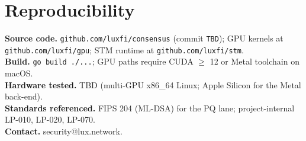 \documentclass[11pt,a4paper]{article}
\begin{document}



\appendix
\section*{Reproducibility}
\textbf{Source code.} \texttt{github.com/luxfi/consensus} (commit \texttt{TBD}); GPU kernels at \texttt{github.com/luxfi/gpu}; STM runtime at \texttt{github.com/luxfi/stm}.\\
\textbf{Build.} \texttt{go build ./...}; GPU paths require CUDA \(\geq\) 12 or Metal toolchain on macOS.\\
\textbf{Hardware tested.} TBD (multi-GPU x86\_64 Linux; Apple Silicon for the Metal back-end).\\
\textbf{Standards referenced.} FIPS 204 (ML-DSA) for the PQ lane; project-internal LP-010, LP-020, LP-070.\\
\textbf{Contact.} security@lux.network.
\end{document}
